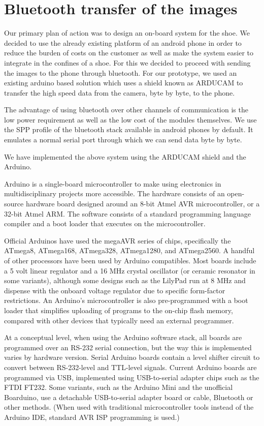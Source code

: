 \documentclass[11pt]{report}
\begin{document}
{{\section{Bluetooth transfer of the images}

Our primary plan of action was to design an on-board system for the shoe. We decided to use the already existing platform of an android phone in order to reduce the burden of costs on the customer as well as make the system easier to integrate in the confines of a shoe. For this we decided to proceed with sending the images to the phone through bluetooth. For our prototype, we used an existing arduino based solution which uses a shield known as ARDUCAM to transfer the high speed data from the camera, byte by byte, to the phone. 

The advantage of using bluetooth over other channels of communication is the low power requirement as well as the low cost of the modules themselves. We use the SPP profile of the bluetooth stack available in android phones by default. It emulates a normal serial port through which we can send data byte by byte. 

We have implemented  the above system using the ARDUCAM shield and the Arduino.

Arduino is a single-board microcontroller to make using electronics in multidisciplinary projects more accessible. The hardware consists of an open-source hardware board designed around an 8-bit Atmel AVR microcontroller, or a 32-bit Atmel ARM. The software consists of a standard programming language compiler and a boot loader that executes on the microcontroller. 

Official Arduinos have used the megaAVR series of chips, specifically the ATmega8, ATmega168, ATmega328, ATmega1280, and ATmega2560. A handful of other processors have been used by Arduino compatibles. Most boards include a 5 volt linear regulator and a 16 MHz crystal oscillator (or ceramic resonator in some variants), although some designs such as the LilyPad run at 8 MHz and dispense with the onboard voltage regulator due to specific form-factor restrictions. An Arduino's microcontroller is also pre-programmed with a boot loader that simplifies uploading of programs to the on-chip flash memory, compared with other devices that typically need an external programmer.

At a conceptual level, when using the Arduino software stack, all boards are programmed over an RS-232 serial connection, but the way this is implemented varies by hardware version. Serial Arduino boards contain a level shifter circuit to convert between RS-232-level and TTL-level signals. Current Arduino boards are programmed via USB, implemented using USB-to-serial adapter chips such as the FTDI FT232. Some variants, such as the Arduino Mini and the unofficial Boarduino, use a detachable USB-to-serial adapter board or cable, Bluetooth or other methods. (When used with traditional microcontroller tools instead of the Arduino IDE, standard AVR ISP programming is used.)

}}
\end{document}
